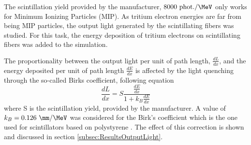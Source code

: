The scintillation yield provided by the manufacturer, $8000~\text{phot.}/\MeV$ only works for Minimum Ionizing Particles (MIP). As tritium electron energies are far from being MIP particles, the output light generated by the scintillating fibers was studied. For this task, the energy deposition of tritium electrons on scintillating fibers was added to the simulation.

The proportionality between the output light per unit of path length, $\frac{dL}{dx}$, and the energy deposited per unit of path length $\frac{dE}{dx}$ is affected by the light quenching through the so-called Birks coefficient, following equation \cite{BirksPaper}
\begin{equation}
\frac{dL}{dx}= S\frac{\displaystyle{\frac{dE}{dx}}}{1+k_B\displaystyle{\frac{dE}{dx}}}
\label{eq:birkscoefficient}
\end{equation}
where S is the scintillation yield, provided by the manufacturer. A value of $k_B=0.126~\mm/\MeV$ was considered for the Birk's coefficient which is the one used for scintillators based on polystyrene \cite{BirksCoefficient}. The effect of this correction is shown and discussed in section \ref{subsec:ResultsOutputLight}.